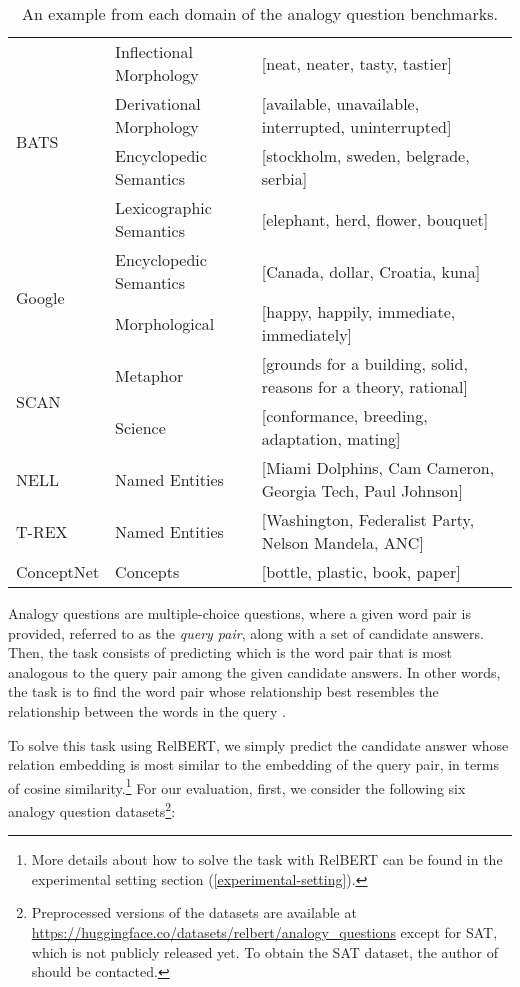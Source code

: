 \documentclass[3p]{elsarticle}
\begin{document}
{\begin{table}[t]
\begin{tabular}{lll}
\multirow{4}{*}{BATS}   & Inflectional Morphology & [neat, neater, tasty, tastier]                                  \\
                        & Derivational Morphology & [available, unavailable, interrupted, uninterrupted]            \\
                        & Encyclopedic Semantics  & [stockholm, sweden, belgrade, serbia]                           \\
                        & Lexicographic Semantics & [elephant, herd, flower, bouquet]                               \\ \midrule
\multirow{2}{*}{Google} & Encyclopedic Semantics  & [Canada, dollar, Croatia, kuna]                                 \\
                        & Morphological           & [happy, happily, immediate, immediately]                        \\ \midrule
\multirow{2}{*}{SCAN}   & Metaphor                & [grounds for a building, solid, reasons for a theory, rational] \\
                        & Science                 & [conformance, breeding, adaptation, mating]        \\
\midrule
NELL	&Named Entities&	[Miami Dolphins, Cam Cameron, Georgia Tech, Paul Johnson] \\
\midrule
T-REX	&Named Entities	&[Washington, Federalist Party, Nelson Mandela, ANC] \\
\midrule
ConceptNet&	Concepts	&[bottle, plastic, book, paper]\\
\bottomrule
\end{tabular}
\caption{An example from each domain of the analogy question benchmarks.}
\label{tab:relbert:analogy-questions-example}
\end{table}

Analogy questions are multiple-choice questions, where a given word pair is provided, referred to as the \emph{query pair}, along with a set of candidate answers. Then, the task consists of predicting which is the word pair that is most analogous to the query pair among the given candidate answers. In other words, the task is to find the word pair whose relationship best resembles the relationship between the words in the query \cite{DBLP:conf/ranlp/TurneyLBS03}. 

To solve this task using RelBERT, we simply predict the candidate answer whose relation embedding is most similar to the embedding of the query pair, in terms of cosine similarity.\footnote{More details about how to solve the task with RelBERT can be found in the experimental setting section (\autoref{experimental-setting}).}
For our evaluation, first, we consider the following six analogy question datasets\footnote{Preprocessed versions of the datasets are available at \url{https://huggingface.co/datasets/relbert/analogy_questions} except for SAT, which is not publicly released yet. To obtain the SAT dataset, the author of \cite{DBLP:conf/ranlp/TurneyLBS03} should be contacted.}:

}
\end{document}
